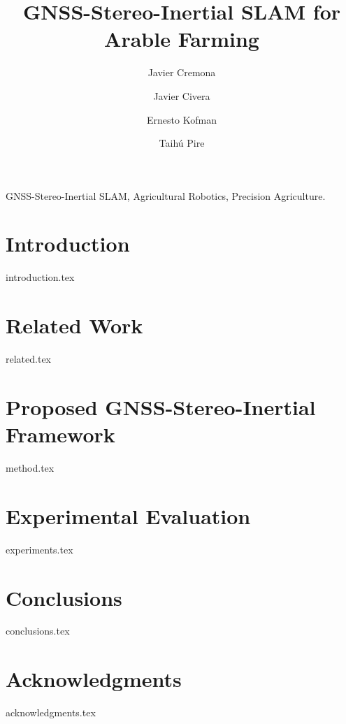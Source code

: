 \documentclass[3p,twocolumn,authoryear]{elsarticle} %
\begin{document}


\begin{frontmatter}

\title{GNSS-Stereo-Inertial SLAM for Arable Farming}

\author[add1]{Javier Cremona}
\author[add2]{Javier Civera}
\author[add1]{Ernesto Kofman}
\author[add1]{Taihú Pire}
\address[add1]{CIFASIS, French Argentine International Center for Information and Systems Sciences (CONICET-UNR), Rosario, Argentina}
\address[add2]{University of Zaragoza, Zaragoza, Spain}


\begin{abstract}

\end{abstract}

\begin{keyword}
GNSS-Stereo-Inertial SLAM, Agricultural Robotics, Precision Agriculture.
\end{keyword}

\end{frontmatter}


\section{Introduction}
\label{sec:introduction}
{introduction.tex}

\section{Related Work}
\label{sec:related}
{related.tex}

\section{Proposed GNSS-Stereo-Inertial Framework}
\label{sec:method}
{method.tex}

\section{Experimental Evaluation}
\label{sec:experiments}
{experiments.tex}

\section{Conclusions}
\label{sec:conclusions}
{conclusions.tex} 

\section*{Acknowledgments}
\label{sec:acknowledgments}
{acknowledgments.tex}


\end{document}
